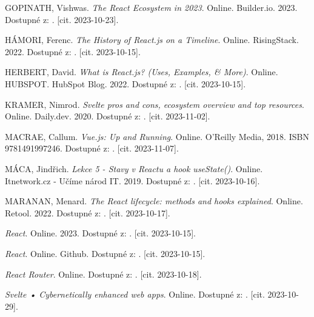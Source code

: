 \begin{thebibliography}{99}
\textsc{GOPINATH}, Vishwas. \emph{The React Ecosystem in 2023}. Online. Builder.io. 2023. Dostupné z: . [cit. 2023-10-23].

\textsc{HÁMORI}, Ferenc. \emph{The History of React.js on a Timeline}. Online. RisingStack. 2022. Dostupné z: . [cit. 2023-10-15].

\textsc{HERBERT}, David. \emph{What is React.js? (Uses, Examples, \& More)}. Online. HUBSPOT. HubSpot Blog. 2022. Dostupné z: . [cit. 2023-10-15].

\textsc{KRAMER}, Nimrod. \emph{Svelte pros and cons, ecosystem overview and top resources}. Online. Daily.dev. 2020. Dostupné z: . [cit. 2023-11-02].

\textsc{MACRAE}, Callum. \emph{Vue.js: Up and Running}. Online. O'Reilly Media, 2018. ISBN 9781491997246. Dostupné z: . [cit. 2023-11-07].

\textsc{MÁCA}, Jindřich. \emph{Lekce 5 - Stavy v Reactu a hook useState()}. Online. Itnetwork.cz - Učíme národ IT. 2019. Dostupné z: . [cit. 2023-10-16].

\textsc{MARANAN}, Menard. \emph{The React lifecycle: methods and hooks explained}. Online. Retool. 2022. Dostupné z: . [cit. 2023-10-17].

\emph{React}. Online. 2023. Dostupné z: . [cit. 2023-10-15].

\emph{React}. Online. Github. Dostupné z: . [cit. 2023-10-15].

\emph{React Router}. Online. Dostupné z: . [cit. 2023-10-18].

\emph{Svelte • Cybernetically enhanced web apps}. Online. Dostupné z: . [cit. 2023-10-29].


\end{thebibliography}
